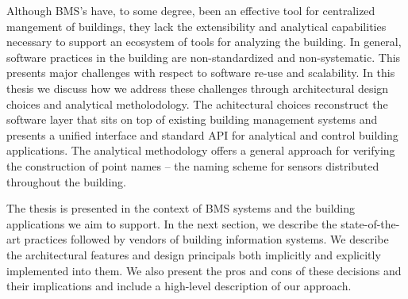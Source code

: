 Although BMS's have, to some degree, been an effective tool for centralized mangement of buildings, they lack the extensibility
and analytical capabilities necessary to support an ecosystem of tools for analyzing the building.  In general, software
practices in the building are non-standardized and non-systematic.
This presents major challenges with respect to software re-use and scalability.  
In this thesis we discuss how we address these challenges through architectural design choices and analytical metholodology.  
The achitectural choices reconstruct the software layer that sits on top of existing building management systems and presents
a unified interface and standard API for analytical and control building applications.
The analytical methodology offers a general approach for verifying the construction of point names -- the naming scheme for 
sensors distributed throughout the building.  

The thesis is presented in the context of BMS systems and the building applications we aim to support.
In the next section, we describe the state-of-the-art practices followed by vendors of building information systems.
We describe the architectural features and design principals both implicitly and explicitly implemented into them.
We also present the pros and cons of these decisions and their implications and include a high-level description of our approach.








